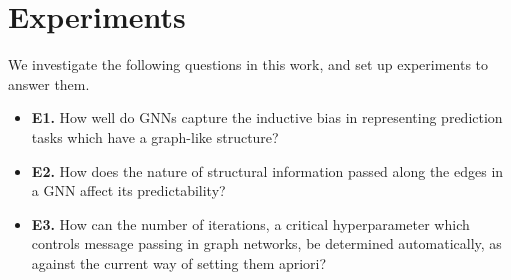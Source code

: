 \section{Experiments}
\label{sec:experiments}
We investigate the following questions in this work, and set up experiments to answer them.

\begin{itemize}[noitemsep,topsep=0pt]
	\item \textbf{E1.} How well do GNNs capture the inductive bias in representing prediction tasks which have a graph-like structure?
	\item \textbf{E2.} How does the nature of structural information passed along the edges in a GNN affect its predictability?
	\item \textbf{E3.} How can the number of iterations, a critical hyperparameter which controls message passing in graph networks, be determined automatically, as against the current way of setting them apriori?
\end{itemize}

